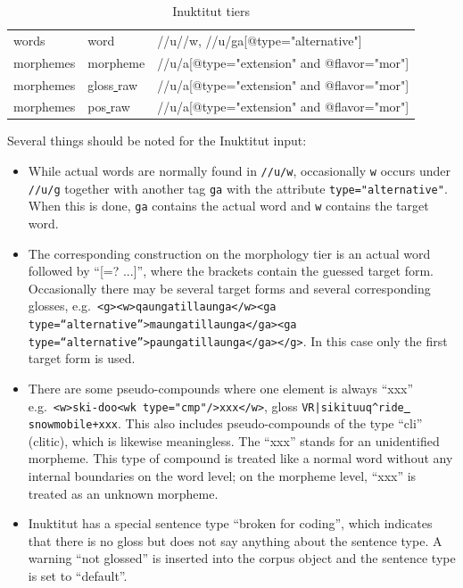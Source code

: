 \documentclass[a4paper, 11pt]{book}
\newcommand{\und}{\underline{{ }}\hspace{0.2mm}}	%
\begin{document}
\begin{table}[ht!]
\begin{tabular}{lll}
			words	 	& word				& //u//w, //u/ga[@type="alternative"] \\
			morphemes	& morpheme			& //u/a[@type="extension" and @flavor="mor"] \\
			morphemes	& gloss\und raw		& //u/a[@type="extension" and @flavor="mor"] \\
			morphemes	& pos\und raw		& //u/a[@type="extension" and @flavor="mor"] \\

		\bottomrule
	\end{tabular}
	\caption{Inuktitut tiers}
	\label{tab:Inuktitut tiers}
\end{table}

\noindent Several things should be noted for the Inuktitut input:

\begin{itemize}
	\item While actual words are normally found in \texttt{//u/w}, occasionally \texttt{w} occurs under \texttt{//u/g} together with another
		 tag \texttt{ga} with the attribute \texttt{type="alternative"}. When this is done, \texttt{ga} contains the actual word 
		 and \texttt{w} contains the target word. 
	\item The corresponding construction on the morphology tier is an actual word followed by “[=? ...]”, where the brackets contain the guessed 
		target form. Occasionally there may be several target forms and several corresponding glosses, e.g.\ \texttt{<g><w>qaungatillaunga</w><ga type=“alternative”>maungatillaunga</ga><ga type=“alternative”>paungatillaunga</ga></g>}. In this case only the first target form is used.
	\item There are some pseudo-compounds where one element is always “xxx” e.g.\ \texttt{<w>ski-doo<wk type="cmp"/>xxx</w>}, gloss 		\texttt{VR|sikituuq\^{}ride\und snowmobile+xxx}. This also includes pseudo-compounds of the type “cli” (clitic), which is likewise meaningless.
		The “xxx” stands for an unidentified morpheme. This type of compound is treated like a normal word without any internal boundaries on the word
		level; on the morpheme level, “xxx” is treated as an unknown morpheme.
	\item Inuktitut has a special sentence type “broken for coding”, which indicates that there is no gloss but does not say anything 
		about the sentence type. A warning “not glossed” is inserted into the corpus object and the sentence type is set to “default”.
\end{itemize}
\end{document}
